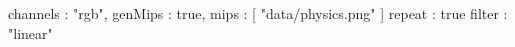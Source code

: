 {
	channels : "rgb",
	genMips : true,
	mips : [
		"data/physics.png"
	]
	repeat : true
	filter : "linear"
}